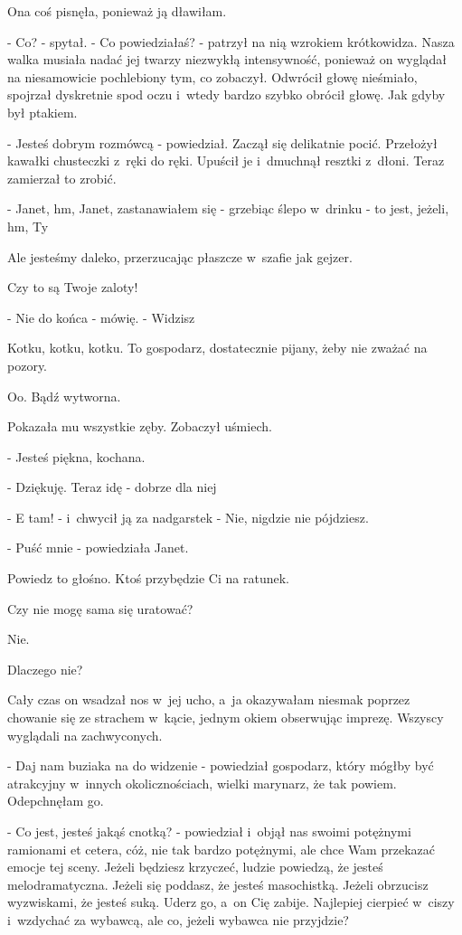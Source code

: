 \documentclass[oneside,polish,12pt,sfheadings]{mwbk}
\begin{document}
Ona coś pisnęła, ponieważ ją dławiłam.

- Co? - spytał. - Co powiedziałaś? - patrzył na nią wzrokiem krótkowidza.
Nasza walka musiała nadać jej twarzy niezwykłą intensywność, ponieważ
on wyglądał na niesamowicie pochlebiony tym, co zobaczył. Odwrócił
głowę nieśmiało, spojrzał dyskretnie spod oczu i~wtedy bardzo szybko
obrócił głowę. Jak gdyby był ptakiem.

- Jesteś dobrym rozmówcą - powiedział. Zaczął się delikatnie pocić.
Przełożył kawałki chusteczki z~ręki do ręki. Upuścił je i~dmuchnął
resztki z~dłoni. Teraz zamierzał to zrobić. 

- Janet, hm, Janet, zastanawiałem
się - grzebiąc ślepo w~drinku - to jest, jeżeli, hm, Ty

Ale jesteśmy daleko, przerzucając płaszcze w~szafie jak gejzer.

Czy to są Twoje zaloty!

- Nie do końca - mówię. - Widzisz

Kotku, kotku, kotku. To gospodarz, dostatecznie pijany, żeby nie zważać
na pozory.

Oo. Bądź wytworna.

Pokazała mu wszystkie zęby. Zobaczył uśmiech.

- Jesteś piękna, kochana.

- Dziękuję. Teraz idę - dobrze dla niej

- E tam! - i~chwycił ją za nadgarstek - Nie, nigdzie nie pójdziesz.

- Puść mnie - powiedziała Janet.

Powiedz to głośno. Ktoś przybędzie Ci na ratunek.

Czy nie mogę sama się uratować?

Nie.

Dlaczego nie?

Cały czas on wsadzał nos w~jej ucho, a~ja okazywałam niesmak poprzez
chowanie się ze strachem w~kącie, jednym okiem obserwując imprezę.
Wszyscy wyglądali na zachwyconych.

- Daj nam buziaka na do widzenie - powiedział gospodarz, który mógłby
być atrakcyjny w~innych okolicznościach, wielki marynarz, że tak powiem.
Odepchnęłam go.

- Co jest, jesteś jakąś cnotką? - powiedział i~objął nas swoimi potężnymi
ramionami et cetera, cóż, nie tak bardzo potężnymi, ale chce Wam przekazać
emocje tej sceny. Jeżeli będziesz krzyczeć, ludzie powiedzą, że jesteś
melodramatyczna. Jeżeli się poddasz, że jesteś masochistką. Jeżeli
obrzucisz wyzwiskami, że jesteś suką. Uderz go, a~on Cię zabije. Najlepiej
cierpieć w~ciszy i~wzdychać za wybawcą, ale co, jeżeli wybawca nie
przyjdzie?
\end{document}
